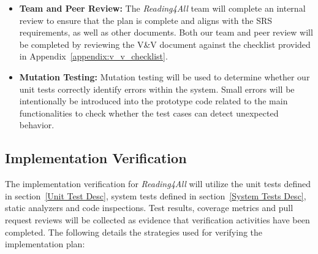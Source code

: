 \documentclass[12pt, titlepage]{article}
\begin{document}
\begin{itemize}
  \item \textbf{Team and Peer Review:}
  The \textit{Reading4All} team will complete an internal review to
  ensure that the plan is complete and aligns with the SRS
  requirements, as well as other documents.
  Both our team and peer review will be completed by reviewing the V\&V
  document against the checklist provided in
  Appendix~\ref{appendix:v_v_checklist}.  
  
  \item \textbf{Mutation Testing:}
  Mutation testing will be used to determine whether our unit tests
  correctly identify errors within the system.
  Small errors will be intentionally be introduced into the prototype
  code related to the main functionalities to check whether the test
  cases can detect unexpected behavior.
\end{itemize}

\subsection{Implementation Verification}

The implementation verification for \textit{Reading4All} will utilize the unit tests defined in section~\ref{Unit Test Desc}, system tests defined in section~\ref{System Tests Desc},
static analyzers and code inspections. Test results, coverage metrics and pull request reviews will be collected as evidence that verification activities have been completed. 
The following details the strategies used for verifying the implementation plan: 
\end{document}
